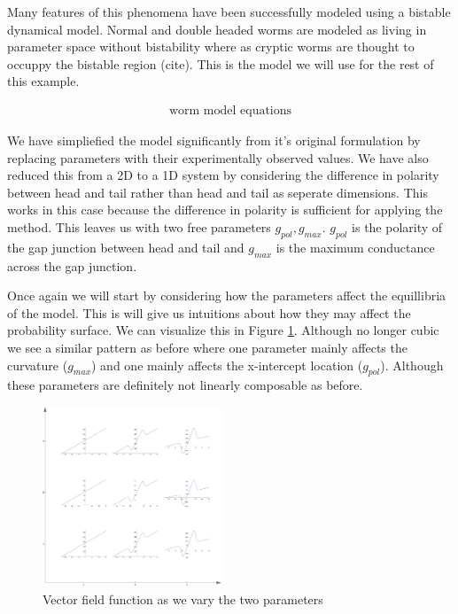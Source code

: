 \documentclass[letterpaper]{article}
\begin{document}
Many features of this phenomena have been successfully modeled using a bistable dynamical
model. Normal and double headed worms are modeled as living in parameter space without
bistability where as cryptic worms are thought to occuppy the bistable region (cite). 
This is the model we will use for the rest of this example.

\begin{eqnarray}
  \text{worm model equations}
\end{eqnarray}

We have simpliefied the model significantly from it's original formulation by replacing
parameters with their experimentally observed values. We have also reduced this from a 
2D to a 1D system by considering the difference in polarity between head and tail rather
than head and tail as seperate dimensions. This works in this case because the difference
in polarity is sufficient for applying the method.
This leaves us with two free parameters
$g_{pol},g_{max}$. $g_{pol}$ is the polarity of the gap junction between head and tail 
and $g_{max}$ is the maximum conductance across the gap junction.

Once again we will start by considering how the parameters affect the equillibria of
the model. This is will give us intuitions about how they may affect the probability
surface. We can visualize this in Figure \ref{fig7}. Although no longer cubic we 
see a similar pattern as before where one parameter mainly affects the curvature ($g_{max}$)
and one mainly affects the x-intercept location ($g_{pol}$). Although these parameters are 
definitely not linearly composable as before.

\begin{figure}[t]
\begin{center}
\includegraphics[width=2.1in,angle=0]{./worm_params.png}
\caption{Vector field function as we vary the two parameters}
\label{fig7}
\end{center}
\end{figure}
\end{document}
